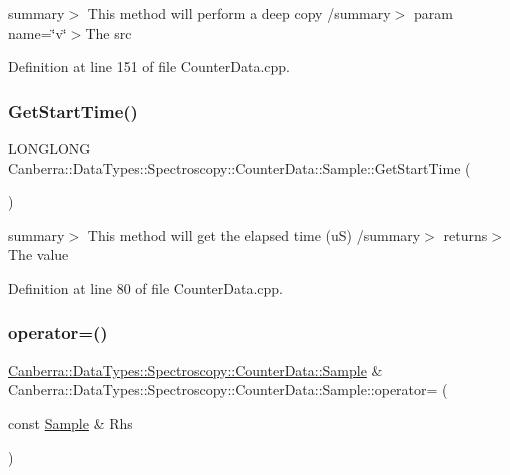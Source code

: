 summary$>$ This method will perform a deep copy /summary$>$ param name=\char`\"{}v\char`\"{}$>$The src

Definition at line 151 of file Counter\+Data.\+cpp.

\mbox{\label{class_canberra_1_1_data_types_1_1_spectroscopy_1_1_counter_data_1_1_sample_a789d176e8a846ea105ce9af768041200_a789d176e8a846ea105ce9af768041200}} 
\subsubsection{\texorpdfstring{Get\+Start\+Time()}{GetStartTime()}}
{\footnotesize\ttfamily L\+O\+N\+G\+L\+O\+NG Canberra\+::\+Data\+Types\+::\+Spectroscopy\+::\+Counter\+Data\+::\+Sample\+::\+Get\+Start\+Time (\begin{DoxyParamCaption}{ }\end{DoxyParamCaption})}

summary$>$ This method will get the elapsed time (uS) /summary$>$ returns$>$The value

Definition at line 80 of file Counter\+Data.\+cpp.

\mbox{\label{class_canberra_1_1_data_types_1_1_spectroscopy_1_1_counter_data_1_1_sample_a17c3050cd9089530e4d5d77ea83380c7_a17c3050cd9089530e4d5d77ea83380c7}} 
\subsubsection{\texorpdfstring{operator=()}{operator=()}}
{\footnotesize\ttfamily \hyperlink{class_canberra_1_1_data_types_1_1_spectroscopy_1_1_counter_data_1_1_sample}{Canberra\+::\+Data\+Types\+::\+Spectroscopy\+::\+Counter\+Data\+::\+Sample} \& Canberra\+::\+Data\+Types\+::\+Spectroscopy\+::\+Counter\+Data\+::\+Sample\+::operator= (\begin{DoxyParamCaption}\item[{const \hyperlink{class_canberra_1_1_data_types_1_1_spectroscopy_1_1_counter_data_1_1_sample}{Sample} \&}]{Rhs }\end{DoxyParamCaption})}

